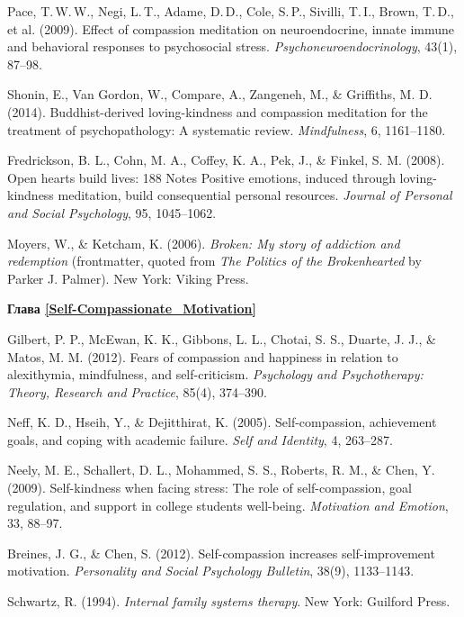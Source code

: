 \begin{thebibliography}{999}
	 Pace, T.\,W.\,W., Negi, L.\,T., Adame, D.\,D., Cole, S.\,P., Sivilli, T.\,I., Brown, T.\,D., et al. (2009). Effect of compassion meditation on neuroendocrine, innate immune and behavioral responses to psychosocial stress. \textit{Psychoneuroendocrinology}, 43(1), 87–98.
	
	 Shonin, E., Van Gordon, W., Compare, A., Zangeneh, M., \& Griffiths, M. D. (2014). Buddhist-derived loving-kindness and compassion meditation for the treatment of psychopathology: A systematic review. \textit{Mindfulness}, 6, 1161–1180.
	
	 Fredrickson, B. L., Cohn, M. A., Coffey, K. A., Pek, J., \& Finkel, S. M. (2008). Open hearts build lives: 188 Notes Positive emotions, induced through loving-kindness meditation, build consequential personal resources. \textit{Journal of Personal and Social Psychology}, 95, 1045–1062.
	
	 Moyers, W., \& Ketcham, K. (2006). \textit{Broken: My story of addiction and redemption} (frontmatter, quoted from \textit{The Politics of the Brokenhearted} by Parker J. Palmer). New York: Viking Press.
	
	
	\vspace{3ex}
	\textbf{Глава \ref{Self-Compassionate_Motivation}}
	
	 Gilbert, P. P., McEwan, K. K., Gibbons, L. L., Chotai, S. S., Duarte, J. J., \& Matos, M. M. (2012). Fears of compassion and happiness in relation to alexithymia, mindfulness, and self-criticism. \textit{Psychology and Psychotherapy: Theory, Research and Practice}, 85(4), 374–390.
	
	 Neff, K. D., Hseih, Y., \& Dejitthirat, K. (2005). Self-compassion, achievement goals, and coping with academic failure. \textit{Self and Identity}, 4, 263–287.
	
	 Neely, M. E., Schallert, D. L., Mohammed, S. S., Roberts, R. M., \& Chen, Y. (2009). Self-kindness when facing stress: The role of self-compassion, goal regulation, and support in college students well-being. \textit{Motivation and Emotion}, 33, 88–97.
	
	 Breines, J. G., \& Chen, S. (2012). Self-compassion increases self-improvement motivation. \textit{Personality and Social Psychology Bulletin}, 38(9), 1133–1143.
	
	 Schwartz, R. (1994). \textit{Internal family systems therapy}. New York: Guilford Press.
	
\end{thebibliography}
